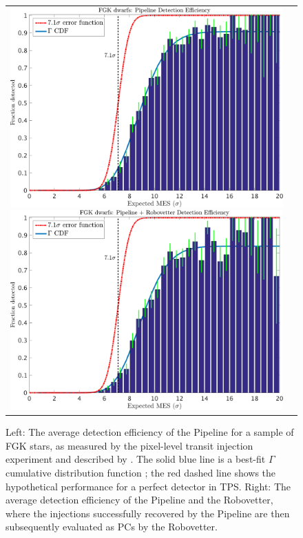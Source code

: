 \begin{figure}[ht]
\centering
\hspace{-2.5em}\begin{tabular}{cc}
\includegraphics[width=0.5\linewidth]{fig-senscurvwithfits_withoutRv-trimmed.pdf} 
\includegraphics[width=0.5\linewidth]{fig-senscurvwithfits_withRv-trimmed.pdf}
\end{tabular}
\caption{Left: The average detection efficiency of the \Kepler{} Pipeline for a sample of FGK stars, as measured by the pixel-level transit injection experiment and described by \citet{Christiansen2017}. The solid blue line is a best-fit $\Gamma$ cumulative distribution function \citep[see Equation 1 of ][]{Christiansen2016}; the red dashed line shows the hypothetical performance for a perfect detector in TPS. Right: The average detection efficiency of the \Kepler{} Pipeline and the Robovetter, where the injections successfully recovered by the Pipeline are then subsequently evaluated as PCs by the Robovetter.}

\label{f:fulldetectionefficiency}

\end{figure}


